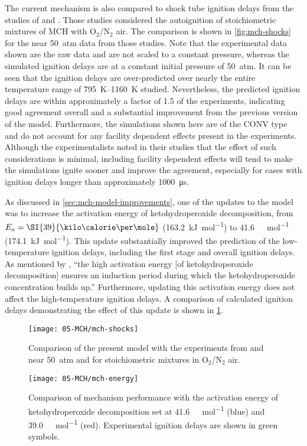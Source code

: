 \documentclass[../main.tex]{subfiles}
\begin{document}
The current mechanism is also compared to shock tube ignition delays from the
studies of \textcite{Vasu2009} and \textcite{Vanderover2009}. Those studies
considered the autoignition of stoichiometric mixtures of MCH with O$_2$/N$_2$
air. The comparison is shown in \cref{fig:mch-shocks} for the near \SI{50}{atm}
data from those studies. Note that the experimental data shown are the raw
data and are not scaled to a constant pressure, whereas the simulated
ignition delays are at a constant initial pressure of \SI{50}{atm}. It can be seen
that the ignition delays are over-predicted over nearly the entire temperature
range of \SIrange{795}{1160}{\kelvin} studied. Nevertheless, the predicted ignition delays are
within approximately a factor of 1.5 of the experiments, indicating good
agreement overall and a substantial improvement from the previous version of
the model. Furthermore, the simulations shown here are of the CONV type and
do not account for any facility dependent effects present in the experiments.
Although the experimentalists noted in their studies \cite{Vasu2009,Vanderover2009} 
that the effect of such considerations is minimal, including facility
dependent effects will tend to make the simulations ignite sooner and improve
the agreement, especially for cases with ignition delays longer than
approximately \SI{1000}{\micro\second}.

As discussed in \cref{sec:mch-model-improvements}, one of the updates to the model
was to increase the activation energy of ketohydroperoxide decomposition, from
$E_a=\SI{39}{\kilo\calorie\per\mole}$ (\SI{163.2}{\kilo\joule\per\mole}) to
\SI{41.6}{\kilo\calorie\per\mole} (\SI{174.1}{\kilo\joule\per\mole}). This
update substantially improved the prediction of the low-temperature ignition
delays, including the first stage and overall ignition delays. As mentioned by
\textcite{Curran2002}, ``the high activation energy [of ketohydroperoxide
decomposition] ensures an induction period during which the ketohydroperoxide
concentration builds up.'' Furthermore, updating this activation energy does not
affect the high-temperature ignition delays. A comparison of calculated
ignition delays demonstrating the effect of this update is shown in
\cref{fig:mch-energy}.

\begin{figure}
    \begin{floatrow}
        \ffigbox
            {\texttt{[image: 05-MCH/mch-shocks]}}
            {\caption{Comparison of the present model with the experiments from
                \textcite{Vasu2009} and \textcite{Vanderover2009} near \SI{50}{atm}
                and for stoichiometric mixtures in O$_2$/N$_2$ air.}
            \label{fig:mch-shocks}}
        \ffigbox
            {\texttt{[image: 05-MCH/mch-energy]}}
            {\caption{Comparison of mechanism performance with the activation energy
                of ketohydroperoxide decomposition set at \SI{41.6}{\kilo\calorie\per\mole} (blue) and
                \SI{39.0}{\kilo\calorie\per\mole} (red). Experimental ignition delays are shown in
                green symbols.}
            \label{fig:mch-energy}}
    \end{floatrow}
\end{figure}
\end{document}
